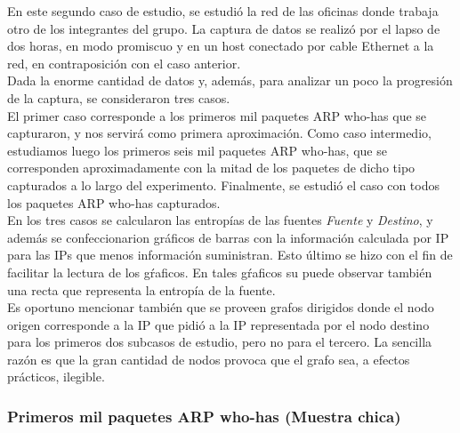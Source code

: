 \indent \indent  En este segundo caso de estudio, se estudió la red de las oficinas donde trabaja otro de los integrantes del grupo. La captura de datos se realizó por el lapso de dos horas, en modo promiscuo y en un host conectado por cable Ethernet a la red, en contraposición con el caso anterior.\\
\indent Dada la enorme cantidad de datos y, además, para analizar un poco la progresión de la captura, se consideraron tres casos.\\
\indent El primer caso corresponde a los primeros mil paquetes ARP who-has que se capturaron, y nos servirá como primera aproximación. Como caso intermedio, estudiamos luego los primeros seis mil paquetes ARP who-has, que se corresponden aproximadamente con la mitad de los paquetes de dicho tipo capturados a lo largo del experimento. Finalmente, se estudió el caso con todos los paquetes ARP who-has capturados.\\
\indent En los tres casos se calcularon las entropías de las fuentes \textit{Fuente} y \textit{Destino}, y además se confeccionarion gráficos de barras con la información calculada por IP para las IPs que menos información suministran. Esto último se hizo con el fin de facilitar la lectura de los gŕaficos. En tales gŕaficos su puede observar también una recta que representa la entropía de la fuente.\\
\indent Es oportuno mencionar también que se proveen grafos dirigidos donde el nodo origen corresponde a la IP que pidió a la IP representada por el nodo destino para los primeros dos subcasos de estudio, pero no para el tercero. La sencilla razón es que la gran cantidad de nodos provoca que el grafo sea, a efectos prácticos, ilegible.\\

\subsubsection{Primeros mil paquetes ARP who-has (Muestra chica)}

